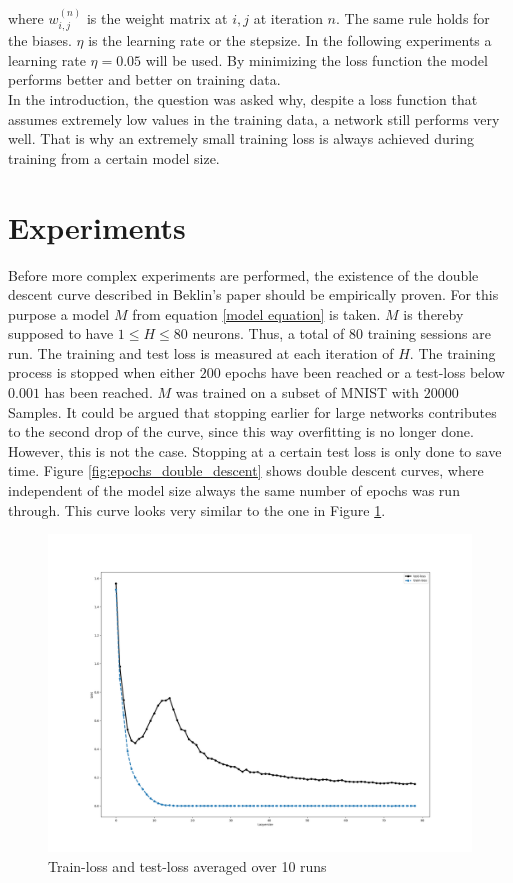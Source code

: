where $w_{i,j}^{(n)}$ is the weight matrix at $i,j$ at iteration $n$. The same rule holds for the biases. $\eta$ is the learning rate or the stepsize. In the following experiments a learning rate $\eta = 0.05$ will be used. By minimizing the loss function the model performs better and better on training data. \\
In the introduction, the question was asked why, despite a loss function that assumes extremely low values in the training data, a network still performs very well. That is why an extremely small training loss is always achieved during training from a certain model size.



\newpage

\section{Experiments}

Before more complex experiments are performed, the existence of the double descent curve described in Beklin's paper should be empirically proven. For this purpose a model $M$ from equation \ref{model equation} is taken. $M$ is thereby supposed to have $1 \leq H \leq 80$ neurons. Thus, a total of 80 training sessions are run. The training and test loss is measured at each iteration of $H$. The training process is stopped when either $200$ epochs have been reached or a test-loss below $0.001$ has been reached. $M$ was trained on a subset of MNIST with $20000$ Samples. It could be argued that stopping earlier for large networks contributes to the second drop of the curve, since this way overfitting is no longer done. However, this is not the case. Stopping at a certain test loss is only done to save time. Figure \ref{fig:epochs_double_descent} shows double descent curves, where independent of the model size always the same number of epochs was run through. This curve looks very similar to the one in Figure \ref{double_descent_vanilla}.

\begin{figure}[!htp]
\centering
\includegraphics[width= 1\linewidth]{Abschlussarbeit_2021/LaTeX/images/double_sgd.png}
\caption{Train-loss and test-loss averaged over 10 runs}
\label{double_descent_vanilla}
\end{figure}

